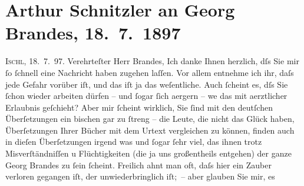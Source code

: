

         
         \renewcommand{\erwaehntePersonen}{Personen: Peter Altenberg, Richard Beer-Hofmann, Georg Brandes, Paul Goldmann}
         \renewcommand{\erwaehnteInstitutionen}{Institutionen: Frankfurter Zeitung}
         \renewcommand{\erwaehnteOrte}{Orte: Bad Ischl, Dänemark, Kopenhagen, Paris, Wien}
         \renewcommand{\erwaehnteWerke}{Werke: Wie ich es sehe}
               \section[Arthur Schnitzler an Georg Brandes, 18. 7. 1897]{ Arthur Schnitzler an Georg Brandes, 18. 7. 1897}\nopagebreak{}\rehead{ }\begin{ledgroupsized}[t]{13cm}\normalsize\beginnumbering \toendnotes[C]{\smallbreak\pagebreak[2]} 
\pstart
           \raggedleft{}{\pb}\textsc{Ischl}, 18. 7. 97. \pend
           \pstart{}Verehrteſter Herr Brandes,\pend\pstart
           Ich danke Ihnen herzlich, dſs Sie mir ſo ſchnell eine Nachricht haben zugehen laſſen.
               Vor allem entnehme ich ihr, daſs jede Gefahr vorüber iſt, und das iſt ja das
               weſentliche. Auch ſcheint es, dſs Sie ſchon wieder arbeiten dürfen – und ſogar ſich
               aergern – we{\geminationn} das mit aerztlicher {\pb}Erlaubnis geſchieht? Aber mir ſcheint wirklich,
               Sie ſind mit den deutſchen Überſetzungen ein bischen gar zu ſtreng – die Leute, die
               nicht das Glück haben, Überſetzungen Ihrer Bücher mit dem Urtext vergleichen zu
               können, finden auch in dieſen Überſetzungen irgend was und ſogar ſehr viel, das \introOben{}ihnen\introOben{} trotz Misverſtändniſſen u Flüchtigkeiten (die ja uns
                  \introOben{}großentheils\introOben{} entgehen) der ganze Georg Brandes zu ſein
               ſcheint. {\pb}Freilich ahnt man oft, daſs hier ein
               Zauber verloren gegangen iſt, der unwiederbringlich iſt; – aber glauben Sie mir, es

\end{ledgroupsized}
